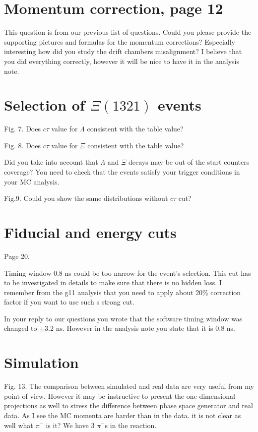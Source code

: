 \documentclass[12pt]{article}
\begin{document}
\section*{Momentum correction, page 12}
This question is from our previous list of questions.
Could you please provide the supporting pictures and formulas for the momentum corrections?
Especially interesting how did you study the drift chambers misalignment?
I believe that you did everything correctly, however it will be nice to have it in the analysis note.

\section*{Selection of $\Xi(1321)$ events}
Fig. 7.  Does $c\tau$ value for $\Lambda$ consistent with the table value? 

Fig. 8.  Does $c\tau$ value for $\Xi$ consistent with the table value?

Did you take into account that $\Lambda$ and $\Xi$ decays may be out of the start counters coverage?
You need to check that the events satisfy your trigger conditions in your MC analysis.

Fig.9. Could you show the same distributions without $c\tau$ cut?

\section*{Fiducial and energy cuts}
Page 20.

Timing window 0.8 ns could be too narrow for the event's selection.
This cut has to be investigated in details to make sure that
there is no hidden loss. I remember from the g11 analysis that
you need to apply about 20\% correction factor if you want to use such s strong cut.

In your reply to our questions you wrote that the software timing window was changed to $\pm$3.2 ns. However in the analysis note you state that it is 0.8 ns.

\section*{Simulation}

Fig. 13. The comparison between simulated and real data are very useful from my point of view.
However it may be instructive to present the one-dimensional projections as well to stress the difference between
phase space generator and real data. As I see the MC momenta are harder than in the data.
it is not clear as well what $\pi^-$ is it? We have 3 $\pi^-$s in the reaction.
\end{document}
